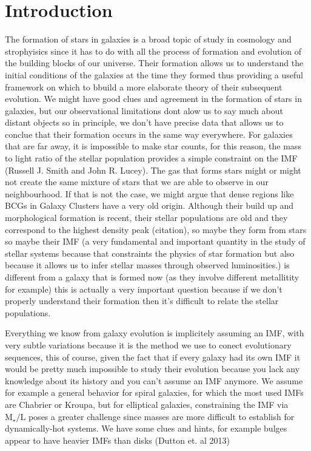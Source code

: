 \chapter{Introduction}

The formation of stars in galaxies is a broad topic of study in cosmology and strophyisics since it has to do with all the process of formation and evolution of the building blocks of our universe. Their formation allows us to understand the initial conditions of the galaxies at the time they formed thus providing a useful framework on which to bbuild a more elaborate theory of their subsequent evolution. We might have good clues and agreement in the formation of stars in galaxies, but our observational limitations dont alow us to say much about distant objects so in principle, we don't have precise data that allows us to conclue that their formation occurs in the same way everywhere. For galaxies that are far away, it is impossible to make star counts, for this reason, the mass to light ratio of the stellar population provides a simple constraint on the IMF (Russell J. Smith and John R. Lucey). The gas that forms stars might or might not create the same mixture of stars that we are able to observe in our neighbourhood. If that is not the case, we might argue that dense regions like BCGs in Galaxy Clusters have a very old origin. Although their build up and morphological formation is recent, their stellar populations are old and they correspond to the highest density peak (citation), so maybe they form from stars so maybe their IMF (a very fundamental and important quantity in the study of stellar systems because that constraints the physics of star formation but also because it allows us to infer stellar masses through observed luminosities.) is different from a galaxy that is formed now (as they involve different metallitity for example) this is actually a very important question because if we don't properly understand their formation then it's difficult to relate the stellar populations. 

Everything we know from galaxy evolution is implicitely assuming an IMF, with very subtle variations because it is the method we use to conect evolutionary sequences, this of course, given the fact that if every galaxy had its own IMF it would be pretty much impossible to study their evolution because you lack any knowledge about its history and you can't assume an IMF anymore. We assume for example a general behavior for spiral galaxies, for which the most used IMFs are Chabrier or Kroupa, but for elliptical galaxies, constraining the IMF via $\textrm{M}_{\star}/\textrm{L}$ poses a greater challenge since masses are more difficult to establish for dynamically-hot systems. We have some clues and hints, for example bulges appear to have heavier IMFs than disks (Dutton et. al 2013)

